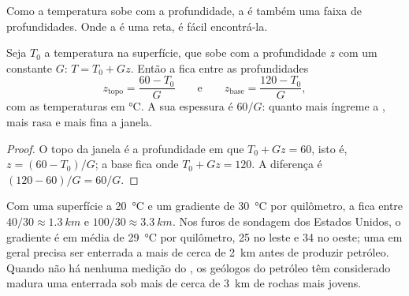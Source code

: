 Como a temperatura sobe com a profundidade, a  é também
uma faixa de profundidades. Onde a  é uma reta, é fácil encontrá-la.

\begin{proposition}\label{prop:g11:fossil-fuel-geology:window-depth}
Seja $T_0$ a temperatura na superfície, que sobe com a profundidade $z$ com
um  constante $G$: $T = T_0 + G z$. Então a  fica entre as profundidades
\[
  z_{\text{topo}} = \frac{60 - T_0}{G}
  \qquad\text{e}\qquad
  z_{\text{base}} = \frac{120 - T_0}{G},
\]
com as temperaturas em \unit{\degreeCelsius}. A sua espessura é $60/G$:
quanto mais íngreme a , mais rasa e mais fina a janela.
\end{proposition}

\begin{proof}
O topo da janela é a profundidade em que $T_0 + G z = 60$, isto é,
$z = (60 - T_0)/G$; a base fica onde $T_0 + G z = 120$. A diferença é
$(120 - 60)/G = 60/G$.
\end{proof}

Com uma superfície a \qty{20}{\degreeCelsius} e um gradiente de
\qty{30}{\degreeCelsius} por quilômetro, a  fica entre
$40/30 \approx \qty{1.3}{km}$ e $100/30 \approx \qty{3.3}{km}$. Nos furos
de sondagem dos Estados Unidos, o gradiente é em média de
\qty{29}{\degreeCelsius} por quilômetro, \num{25} no leste e \num{34} no
oeste; uma  em geral precisa ser enterrada a mais de cerca de
\qty{2}{km} antes de produzir petróleo. Quando não há nenhuma medição do
, os geólogos do petróleo têm considerado madura uma  enterrada sob mais de cerca de \qty{3}{km} de rochas mais jovens.

